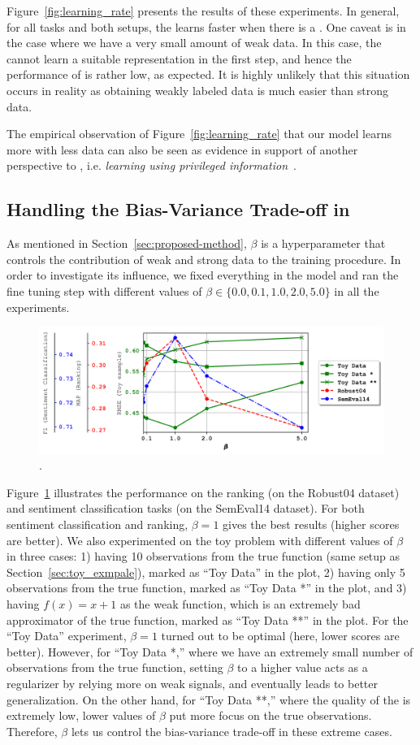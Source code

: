Figure~\ref{fig:learning_rate} presents the results of these experiments. In general, for all tasks and both setups, the \std learns faster when there is a \tch.
One caveat is in the case where we have a very small amount of weak data. In this case, the \std cannot learn a suitable representation in the first step, and hence the performance of \fwl is rather low, as expected. It is highly unlikely that this situation occurs in reality as obtaining weakly labeled data is much easier than strong data.

The empirical observation of Figure~\ref{fig:learning_rate} that our model learns more with less data can also be seen as evidence in support of another perspective to \fwl, i.e. \emph{learning using privileged information}~\citep{vapnik2015learning}. 


\subsection{Handling the Bias-Variance Trade-off in \fwl}
\label{sec:bias-variance}
As mentioned in Section~\ref{sec:proposed-method}, $\beta$ is a hyperparameter that controls the contribution of weak and strong data to the training procedure. In order to investigate its influence, we fixed everything in the model and ran the fine tuning step with different values of $\beta \in \{0.0, 0.1, 1.0, 2.0, 5.0\}$ in all the experiments.

%
\begin{figure}[!t]
    \centering
    \includegraphics[width=0.\textwidth]{03-part-02/chapter-05/figs_and_tables/plot_beta_fwl.png}
    \caption{\fontsize{8}{7}\selectfont{Effect of different values for $\beta$}.}
    \label{fig:beta}
\end{figure}
Figure~\ref{fig:beta} illustrates the performance on the ranking (on the Robust04 dataset) and sentiment classification tasks (on the SemEval14 dataset).  For both sentiment classification and ranking, $\beta=1$ gives the best results (higher scores are better).
%
We also experimented on the toy problem with different values of $\beta$ in three cases: 
1) having 10 observations from the true function (same setup as Section~\ref{sec:toy_exmpale}), marked as ``Toy Data'' in the plot, 
2) having only 5 observations from the true function, marked as ``Toy Data *'' in the plot, and 
3) having $f(x) = x + 1$ as the weak function, which is an extremely bad approximator of the true function, marked as ``Toy Data **'' in the plot.
%
For the ``Toy Data'' experiment, $\beta=1$ turned out to be optimal (here, lower scores are better). However, for ``Toy Data *,'' where we have an extremely small number of observations from the true function, setting $\beta$ to a higher value acts as a regularizer by relying more on weak signals, and eventually leads to better generalization. 
On the other hand, for ``Toy Data **,'' where the quality of the \wa is extremely low, lower values of $\beta$ put more focus on the true observations. Therefore, $\beta$ lets us control the bias-variance trade-off in these extreme cases.


